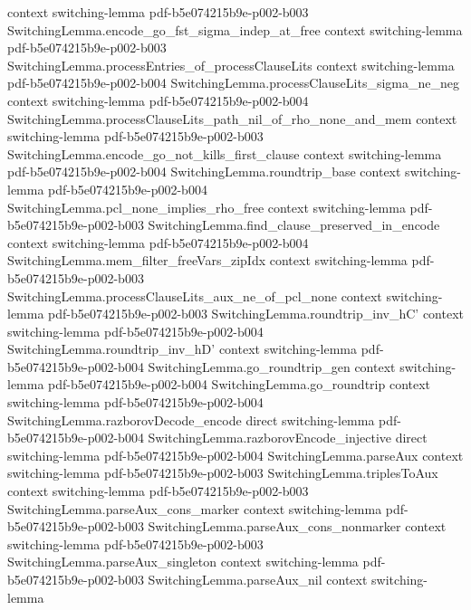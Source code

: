 \begin{lemma}
  {context}
  {switching-lemma}
  {pdf-b5e074215b9e-p002-b003}
\proofstep
  {SwitchingLemma.encode_go_fst_sigma_indep_at_free}
  {context}
  {switching-lemma}
  {pdf-b5e074215b9e-p002-b003}
\proofstep
  {SwitchingLemma.processEntries_of_processClauseLits}
  {context}
  {switching-lemma}
  {pdf-b5e074215b9e-p002-b004}
\proofstep
  {SwitchingLemma.processClauseLits_sigma_ne_neg}
  {context}
  {switching-lemma}
  {pdf-b5e074215b9e-p002-b004}
\proofstep
  {SwitchingLemma.processClauseLits_path_nil_of_rho_none_and_mem}
  {context}
  {switching-lemma}
  {pdf-b5e074215b9e-p002-b003}
\proofstep
  {SwitchingLemma.encode_go_not_kills_first_clause}
  {context}
  {switching-lemma}
  {pdf-b5e074215b9e-p002-b004}
\proofstep
  {SwitchingLemma.roundtrip_base}
  {context}
  {switching-lemma}
  {pdf-b5e074215b9e-p002-b004}
\proofstep
  {SwitchingLemma.pcl_none_implies_rho_free}
  {context}
  {switching-lemma}
  {pdf-b5e074215b9e-p002-b003}
\proofstep
  {SwitchingLemma.find_clause_preserved_in_encode}
  {context}
  {switching-lemma}
  {pdf-b5e074215b9e-p002-b004}
\proofstep
  {SwitchingLemma.mem_filter_freeVars_zipIdx}
  {context}
  {switching-lemma}
  {pdf-b5e074215b9e-p002-b003}
\proofstep
  {SwitchingLemma.processClauseLits_aux_ne_of_pcl_none}
  {context}
  {switching-lemma}
  {pdf-b5e074215b9e-p002-b003}
\proofstep
  {SwitchingLemma.roundtrip_inv_hC'}
  {context}
  {switching-lemma}
  {pdf-b5e074215b9e-p002-b004}
\proofstep
  {SwitchingLemma.roundtrip_inv_hD'}
  {context}
  {switching-lemma}
  {pdf-b5e074215b9e-p002-b004}
\proofstep
  {SwitchingLemma.go_roundtrip_gen}
  {context}
  {switching-lemma}
  {pdf-b5e074215b9e-p002-b004}
\proofstep
  {SwitchingLemma.go_roundtrip}
  {context}
  {switching-lemma}
  {pdf-b5e074215b9e-p002-b004}
\proofstep
  {SwitchingLemma.razborovDecode_encode}
  {direct}
  {switching-lemma}
  {pdf-b5e074215b9e-p002-b004}
\proofstep
  {SwitchingLemma.razborovEncode_injective}
  {direct}
  {switching-lemma}
  {pdf-b5e074215b9e-p002-b004}
\proofstep
  {SwitchingLemma.parseAux}
  {context}
  {switching-lemma}
  {pdf-b5e074215b9e-p002-b003}
\proofstep
  {SwitchingLemma.triplesToAux}
  {context}
  {switching-lemma}
  {pdf-b5e074215b9e-p002-b003}
\proofstep
  {SwitchingLemma.parseAux_cons_marker}
  {context}
  {switching-lemma}
  {pdf-b5e074215b9e-p002-b003}
\proofstep
  {SwitchingLemma.parseAux_cons_nonmarker}
  {context}
  {switching-lemma}
  {pdf-b5e074215b9e-p002-b003}
\proofstep
  {SwitchingLemma.parseAux_singleton}
  {context}
  {switching-lemma}
  {pdf-b5e074215b9e-p002-b003}
\proofstep
  {SwitchingLemma.parseAux_nil}
  {context}
  {switching-lemma}

\end{lemma}

